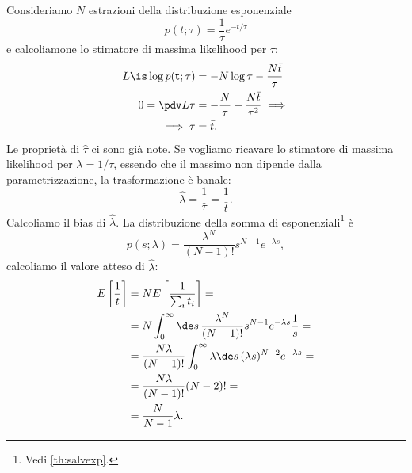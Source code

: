 \begin{example}
	Consideriamo $N$ estrazioni della distribuzione esponenziale
	\begin{equation*}
		p(t;\tau)
		= \frac1\tau e^{-t/\tau}
	\end{equation*}
	e calcoliamone lo stimatore di massima likelihood per $\tau$:
	\begin{align*}
		L \is \log p(\mathbf t;\tau)
		&= -N\log\tau - \frac{N\bar t}\tau \\
		0 = \pdv L\tau
		&= -\frac N\tau + \frac{N\bar t}{\tau^2} \implies \\
		\implies \tau
		&= \bar t.
	\end{align*}
	Le proprietà di $\hat\tau$ ci sono già note.
	Se vogliamo ricavare lo stimatore di massima likelihood per $\lambda=1/\tau$,
	essendo che il massimo non dipende dalla parametrizzazione,
	la trasformazione è banale:
	\begin{equation*}
		\hat\lambda = \frac1{\hat\tau} = \frac1{\bar t}.
	\end{equation*}
	Calcoliamo il bias di $\hat\lambda$.
	La distribuzione della somma di esponenziali\footnote{Vedi \autoref{th:salvexp}.} è
	\begin{equation*}
		p(s;\lambda)
		= \frac{\lambda^N}{(N-1)!}s^{N-1}e^{-\lambda s},
	\end{equation*}
	calcoliamo il valore atteso di $\hat\lambda$:
	\begin{align*}
		E \left[\frac1{\bar t}\right]
		&= N E \left[\frac1{\sum_i t_i}\right] = \\
		&= N \int_0^\infty \de s\, \frac{\lambda^N}{(N-1)!}s^{N-1}e^{-\lambda s} \frac 1s = \\
		&= \frac{N\lambda}{(N-1)!} \int_0^\infty \lambda\de s\, (\lambda s)^{N-2} e^{-\lambda s} = \\
		&= \frac{N\lambda}{(N-1)!} (N-2)! = \\
		&= \frac N{N-1} \lambda.
	\end{align*}
\end{example}

